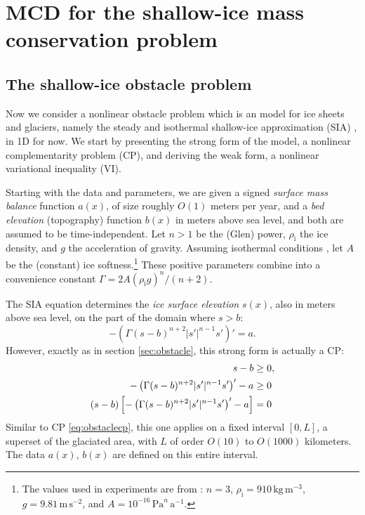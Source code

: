 \documentclass[letterpaper,final,12pt,reqno]{amsart}
\theoremstyle{claim}
\newcommand{\rhoi}{\rho_{\text{i}}}
\numberwithin{equation}{section}
\numberwithin{figure}{section}
\numberwithin{table}{section}
\numberwithin{theorem}{section}
\begin{document}
\section{MCD for the shallow-ice mass conservation problem} \label{sec:sia}

\subsection{The shallow-ice obstacle problem} \label{subsec:siaproblem}  Now we consider a nonlinear obstacle problem which is an model for ice sheets and glaciers, namely the steady and isothermal shallow-ice approximation (SIA)  \cite{Bueleretal2005,Huybrechtsetal1996,vanderVeen2013}, in 1D for now.  We start by presenting the strong form of the model, a nonlinear complementarity problem (CP), and deriving the weak form, a nonlinear variational inequality (VI).

Starting with the data and parameters, we are given a signed \emph{surface mass balance} function $a(x)$, of size roughly $O(1)$ meters per year, and a \emph{bed elevation} (topography) function $b(x)$ in meters above sea level, and both are assumed to be time-independent.  Let $n>1$ be the (Glen) power, $\rhoi$ the ice density, and $g$ the acceleration of gravity.  Assuming isothermal conditions \cite{GreveBlatter2009}, let $A$ be the (constant) ice softness.\footnote{The values used in experiments are from \cite{Huybrechtsetal1996}: $n=3$, $\rhoi=910 \,\text{kg}\,\text{m}^{-3}$, $g=9.81 \,\text{m}\,\text{s}^{-2}$, and $A=10^{-16} \,\text{Pa}^n\,\text{a}^{-1}$.}  These positive parameters combine into a convenience constant $\Gamma = 2 A (\rhoi g)^n / (n+2)$.

The SIA equation determines the \emph{ice surface elevation} $s(x)$, also in meters above sea level, on the part of the domain where $s>b$:
\begin{equation}
- \left(\Gamma (s-b)^{n+2} |s'|^{n-1} s'\right)' = a.  \label{eq:sia}
\end{equation}
However, exactly as in section \ref{sec:obstacle}, this strong form is actually a CP:
\begin{align}
s - b &\ge 0, \label{eq:siacp} \\
- \left(\Gamma (s-b)^{n+2} |s'|^{n-1} s'\right)' - a &\ge 0 \notag \\
(s-b) \left[-\left(\Gamma (s-b)^{n+2} |s'|^{n-1} s'\right)' - a\right] &= 0 \notag
\end{align}
Similar to CP \eqref{eq:obstaclecp}, this one applies on a fixed interval $[0,L]$, a superset of the glaciated area, with $L$ of order $O(10)$ to $O(1000)$ kilometers.  The data $a(x)$, $b(x)$ are defined on this entire interval.
\end{document}
